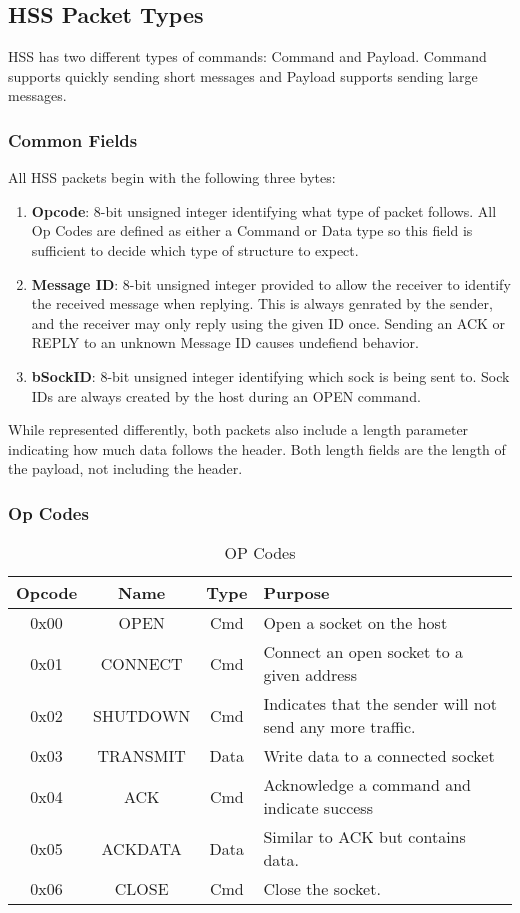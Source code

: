 \documentclass[10pt]{article}
\begin{document}
	\subsection{HSS Packet Types}
	HSS has two different types of commands: Command and Payload. Command supports quickly sending short messages and Payload supports sending large messages.
	\subsubsection{Common Fields}
	All HSS packets begin with the following three bytes:\\
	\begin{enumerate}
		\item \textbf{Opcode}: 8-bit unsigned integer identifying what type of packet follows. All Op Codes are defined as either a Command or Data type so this field is sufficient to decide which type of structure to expect.
		\item \textbf{Message ID}: 8-bit unsigned integer provided to allow the receiver to identify the received message when replying. This is always genrated by the sender, and the receiver may only reply using the given ID once. Sending an ACK or REPLY to an unknown Message ID causes undefiend behavior.
		\item \textbf{bSockID}: 8-bit unsigned integer identifying which sock is being sent to. Sock IDs are always created by the host during an OPEN command.
	\end{enumerate}
	While represented differently, both packets also include a length parameter indicating how much data follows the header. Both length fields are the length of the payload, not including the header. 
	
	\subsubsection{Op Codes}
	\begin{table}[h!]
		\begin{center}
			\caption{OP Codes}
			\label{tab:table1}
			\begin{tabular}{c|c|c|l} 
				\rowcolor{lightgray}
				\textbf{Opcode} &	\textbf{Name} &	\textbf{Type} & \textbf{Purpose}\\
				\hline
				0x00 & OPEN & Cmd & Open a socket on the host\\
				0x01 & CONNECT & Cmd & Connect an open socket to a given address\\
				0x02 & SHUTDOWN & Cmd & Indicates that the sender will not send any more traffic.\\
				0x03 & TRANSMIT & Data & Write data to a connected socket\\
				0x04 & ACK	& Cmd & Acknowledge a command and indicate success\\
				0x05 & ACKDATA	& Data & Similar to ACK but contains data. \\
				0x06 & CLOSE	& Cmd & Close the socket. \\
			\end{tabular}
		\end{center}
	\end{table}
\end{document}
